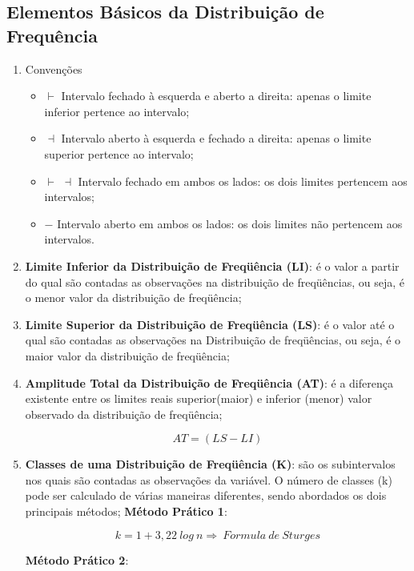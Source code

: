 \newpage


\subsection{Elementos Básicos da Distribuição de Frequência}


\begin{enumerate}
  \item Convenções
  \begin{itemize}
    \item $\vdash$ Intervalo fechado à esquerda e aberto a direita: apenas o limite inferior pertence ao intervalo;
    \item $\dashv$ Intervalo aberto à esquerda e fechado a direita: apenas o limite superior pertence ao intervalo;
    \item $\vdash$ $\dashv$ Intervalo fechado em ambos os lados: os dois limites pertencem aos intervalos;
    \item $-$ Intervalo aberto em ambos os lados: os dois limites não pertencem aos intervalos.
  \end{itemize}
  \item \textbf{Limite Inferior da Distribuição de Freqüência (LI)}: é o valor a partir do qual são contadas as observações na distribuição de freqüências, ou seja, é o menor valor da distribuição de freqüência;
  \item \textbf{Limite Superior da Distribuição de Freqüência (LS)}: é o valor até o qual são contadas as observações na Distribuição de freqüências, ou seja, é o maior valor da distribuição de freqüência;
  \item \textbf{Amplitude Total da Distribuição de Freqüência (AT)}: é a diferença existente entre os limites reais superior(maior) e inferior (menor) valor observado da distribuição de freqüência;

     $$ AT= (LS-LI) $$

  \item \textbf{Classes de uma Distribuição de Freqüência (K)}: são os subintervalos nos quais são contadas as observações da variável. O número de classes (k) pode ser calculado de várias maneiras diferentes, sendo abordados os dois principais métodos;\vskip0.3cm
\textbf{Método Prático 1}:

$$ k= 1+3,22 \ log \ n \Rightarrow \ Formula \ de \ Sturges $$

\textbf{Método Prático 2}: \vskip0.3cm


\end{enumerate}
